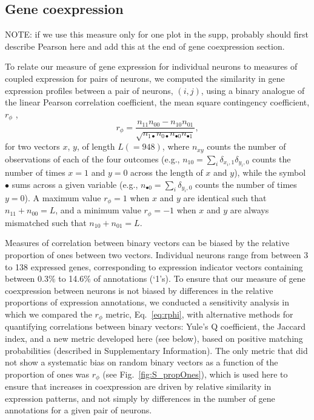 \documentclass[10pt,letterpaper]{article}
\begin{document}
\subsection*{Gene coexpression}
NOTE: if we use this measure only for one plot in the supp, probably should first describe Pearson here and add this at the end of gene coexpression section.

To relate our measure of gene expression for individual neurons to measures of coupled expression for pairs of neurons, we computed the similarity in gene expression profiles between a pair of neurons, $(i,j)$, using a binary analogue of the linear Pearson correlation coefficient, the mean square contingency coefficient, $r_\phi$ \cite{Warrens2008},
\begin{equation} \label{eq:rphi}
    r_\phi = \frac{n_{11}n_{00} - n_{10}n_{01}}{\sqrt{n_{1\bullet}n_{0\bullet}n_{\bullet 0}n_{\bullet 1}}},
\end{equation}
for two vectors $x$, $y$, of length $L(=948)$, where $n_{xy}$ counts the number of observations of each of the four outcomes (e.g., $n_{10} = \sum_i \delta_{x_i,1}\delta_{y_i,0}$ counts the number of times $x=1$ and $y=0$ across the length of $x$ and $y$), while the symbol $\bullet$ sums across a given variable (e.g., $n_{\bullet 0} = \sum_i \delta_{y_i,0}$ counts the number of times $y = 0$).
A maximum value $r_\phi = 1$ when $x$ and $y$ are identical such that $n_{11} + n_{00} = L$, and a minimum value $r_\phi = -1$ when $x$ and $y$ are always mismatched such that $n_{10} + n_{01} = L$.

Measures of correlation between binary vectors can be biased by the relative proportion of ones between two vectors.
Individual neurons range from between 3 to 138 expressed genes, corresponding to expression indicator vectors containing between 0.3\% to 14.6\% of annotations (`1's).
To ensure that our measure of gene coexpression between neurons is not biased by differences in the relative proportions of expression annotations, we conducted a sensitivity analysis in which we compared the $r_\phi$ metric, Eq.~\eqref{eq:rphi}, with alternative methods for quantifying correlations between binary vectors: Yule's Q coefficient, the Jaccard index, and a new metric developed here (see below), based on positive matching probabilities (described in Supplementary Information).
The only metric that did not show a systematic bias on random binary vectors as a function of the proportion of ones was $r_\phi$ (see Fig.~\ref{fig:S_propOnes}), which is used here to ensure that increases in coexpression are driven by relative similarity in expression patterns, and not simply by differences in the number of gene annotations for a given pair of neurons.
\end{document}
